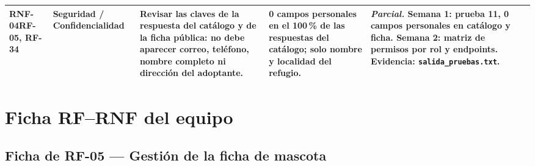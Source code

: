 \documentclass[11pt,a4paper]{article}
\newcommand{\code}[1]{\texttt{#1}}
\begin{document}
{\begin{tabularx}{\linewidth}{@{}V{0.55}V{1.0}V{1.3}V{1.05}V{1.1}@{}}
\textbf{RNF-04}\newline RF-05, RF-34 &
\textbf{Seguridad} / Confidencialidad &
Revisar las claves de la respuesta del catálogo y de la ficha pública: no debe aparecer
correo, teléfono, nombre completo ni dirección del adoptante. &
0 campos personales en el 100\,\% de las respuestas del catálogo; solo nombre y localidad
del refugio. &
\textit{Parcial.} Semana 1: prueba 11, 0 campos personales en catálogo y ficha. Semana 2:
matriz de permisos por rol y endpoints. Evidencia:
\code{salida\_pruebas.txt}. \\
\bottomrule
\end{tabularx}
}

\clearpage

\section{Ficha RF--RNF del equipo}

\subsection{Ficha de RF-05 --- Gestión de la ficha de mascota}
\end{document}
